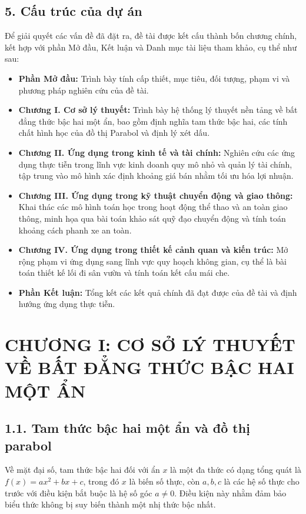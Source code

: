 \documentclass[14pt, a4paper, oneside]{extreport}
\begin{document}
\subsection*{5. Cấu trúc của dự án}
Để giải quyết các vấn đề đã đặt ra, đề tài được kết cấu thành bốn chương chính, kết hợp với phần Mở đầu, Kết luận và Danh mục tài liệu tham khảo, cụ thể như sau:

\begin{itemize}
    \item \textbf{Phần Mở đầu:} Trình bày tính cấp thiết, mục tiêu, đối tượng, phạm vi và phương pháp nghiên cứu của đề tài.
    \item \textbf{Chương I. Cơ sở lý thuyết:} Trình bày hệ thống lý thuyết nền tảng về bất đẳng thức bậc hai một ẩn, bao gồm định nghĩa tam thức bậc hai, các tính chất hình học của đồ thị Parabol và định lý xét dấu.
    \item \textbf{Chương II. Ứng dụng trong kinh tế và tài chính:} Nghiên cứu các ứng dụng thực tiễn trong lĩnh vực kinh doanh quy mô nhỏ và quản lý tài chính, tập trung vào mô hình xác định khoảng giá bán nhằm tối ưu hóa lợi nhuận.
    \item \textbf{Chương III. Ứng dụng trong kỹ thuật chuyển động và giao thông:} Khai thác các mô hình toán học trong hoạt động thể thao và an toàn giao thông, minh họa qua bài toán khảo sát quỹ đạo chuyển động và tính toán khoảng cách phanh xe an toàn.
    \item \textbf{Chương IV. Ứng dụng trong thiết kế cảnh quan và kiến trúc:} Mở rộng phạm vi ứng dụng sang lĩnh vực quy hoạch không gian, cụ thể là bài toán thiết kế lối đi sân vườn và tính toán kết cấu mái che.
    \item \textbf{Phần Kết luận:} Tổng kết các kết quả chính đã đạt được của đề tài và định hướng ứng dụng thực tiễn.
\end{itemize}
\newpage
\section*{\centering CHƯƠNG I: CƠ SỞ LÝ THUYẾT VỀ BẤT ĐẲNG THỨC BẬC HAI MỘT ẨN}

\subsection*{1.1. Tam thức bậc hai một ẩn và đồ thị parabol}
Về mặt đại số, tam thức bậc hai đối với ẩn $x$ là một đa thức có dạng tổng quát là $f(x) = ax^2 + bx + c$, trong đó $x$ là biến số thực, còn $a, b, c$ là các hệ số thực cho trước với điều kiện bắt buộc là hệ số góc $a \neq 0$. Điều kiện này nhằm đảm bảo biểu thức không bị suy biến thành một nhị thức bậc nhất.
\end{document}
